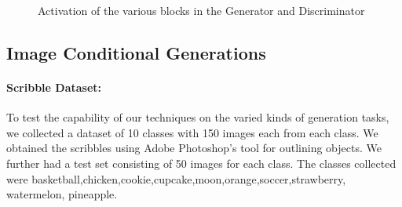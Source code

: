 \documentclass[10pt,twocolumn,letterpaper]{article}
\begin{document}
\begin{figure}%
    \centering
    \caption{Activation of the various blocks in the Generator and Discriminator}
    \label{fig:mnist_act}
    \vspace{-3mm}
\end{figure}




\subsection{Image Conditional Generations}

\paragraph{Scribble Dataset:}
To test the capability of our techniques on the varied kinds of generation tasks, we collected a dataset of 10 classes with 150 images each from each class. We obtained the scribbles using Adobe Photoshop's tool for outlining objects. We further had a test set consisting of 50 images for each class. The classes collected were basketball,chicken,cookie,cupcake,moon,orange,soccer,strawberry, watermelon, pineapple. 

\newcommand{\addSubFigTenth}[3]{\begin{subfigure}[t]{.16\linewidth}
   \texttt{[image: \#1]}
   \caption{#2}\label{#3}\end{subfigure}
}
\end{document}
